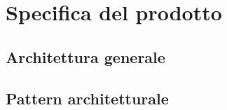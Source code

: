 \newpage
\section{Specifica del prodotto}

\subsection{Architettura generale}

\subsection{Pattern architetturale}

